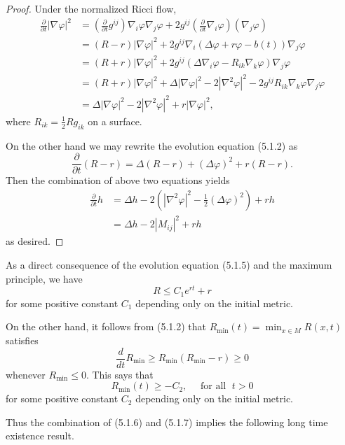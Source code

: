 \begin{proof}
Under the normalized Ricci flow,
\begin{align*}
\frac{\partial}{\partial t}|\nabla \varphi|^2& =
\left(\frac{\partial}{\partial t}g^{ij}\right)
\nabla_i\varphi\nabla_j\varphi+2g^{ij}\left(\frac{\partial}{\partial
t}\nabla_i\varphi\right)(\nabla_j\varphi)\\
&  =(R-r)|\nabla\varphi|^2+2g^{ij}\nabla_i
(\Delta\varphi+r\varphi-b(t))\nabla_j\varphi\\
&  =(R+r)|\nabla\varphi|^2+2g^{ij}
(\Delta\nabla_i\varphi-R_{ik}\nabla_k\varphi)\nabla_j\varphi\\
&  =(R+r)|\nabla\varphi|^2+\Delta|\nabla\varphi|^2
-2|\nabla^2\varphi|^2-2g^{ij}R_{ik}\nabla_k\varphi\nabla_j\varphi\\
&
=\Delta|\nabla\varphi|^2-2|\nabla^2\varphi|^2+r|\nabla\varphi|^2,
\end{align*}
where $R_{ik}=\frac{1}{2}Rg_{ik}$ on a surface.

On the other hand we may rewrite the evolution equation (5.1.2) as
$$
\frac{\partial}{\partial t}(R-r)=\Delta(R-r)+(\Delta
\varphi)^2+r(R-r).
$$
Then the combination of above two equations yields
\begin{align*}
\frac{\partial}{\partial t}h&  =\Delta
h-2(|\nabla^2\varphi|^2-\frac{1}{2}(\Delta\varphi)^2)+rh\\
&  =\Delta h-2|M_{ij}|^2+rh
\end{align*}
as desired.
\end{proof}

As a direct consequence of the evolution equation (5.1.5) and the
maximum principle, we have \begin{equation}
R\leq C_1e^{rt}+r %
\end{equation} for some positive constant $C_1$ depending only on the initial
metric.

On the other hand, it follows from (5.1.2) that
$R_{\min}(t)=\min_{x\in M}R(x,t)$ satisfies
$$
\frac{d}{dt}R_{\min}\geq R_{\min}(R_{\min}-r)\geq 0
$$
whenever $R_{\min}\leq 0$. This says that \begin{equation}
R_{\min}(t)\geq-C_2, \quad\text{ for all }\; t>0 %
\end{equation} for some positive constant $C_2$ depending only on the initial
metric.

Thus the combination of (5.1.6) and (5.1.7) implies the following
long time existence result.


